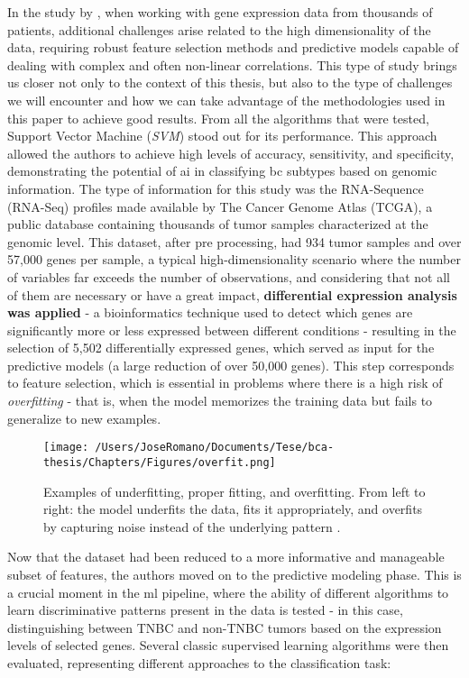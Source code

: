 In the study by \textcite{bca_subtypes_with_ml_Wu_2021}, when working with gene
expression data from thousands of patients, additional challenges arise related
to the high dimensionality of the data, requiring robust feature selection
methods and predictive models capable of dealing with complex and often
non-linear correlations. This type of study brings us closer not only to the
context of this thesis, but also to the type of challenges we will encounter
and how we can take advantage of the methodologies used in this paper to
achieve good results. From all the algorithms that were tested, Support Vector
Machine (\textit{SVM}) stood out for its performance. This approach allowed the
authors to achieve high levels of accuracy, sensitivity, and specificity,
demonstrating the potential of \gls{ai} in classifying \gls{bc} subtypes based
on genomic information. The type of information for this study was the
RNA-Sequence (RNA-Seq) profiles made available by The Cancer Genome Atlas
(TCGA), a public database containing thousands of tumor samples characterized
at the genomic level. This dataset, after pre processing, had 934 tumor samples
and over 57{,}000 genes per sample, a typical high-dimensionality scenario
where the number of variables far exceeds the number of observations, and
considering that not all of them are necessary or have a great impact,
\textbf{differential expression analysis was applied} - a bioinformatics
technique used to detect which genes are significantly more or less expressed
between different conditions - resulting in the selection of 5{,}502
differentially expressed genes, which served as input for the predictive models
(a large reduction of over 50{,}000 genes). This step corresponds to feature
selection, which is essential in problems where there is a high risk of
\textit{overfitting} - that is, when the model memorizes the training data but
fails to generalize to new examples.

\begin{figure} [h]
  \centering
  \texttt{[image: /Users/JoseRomano/Documents/Tese/bca-thesis/Chapters/Figures/overfit.png]}
  \caption{Examples of underfitting, proper fitting, and overfitting.
    From left to right: the model underfits the data, fits it appropriately, and overfits by capturing noise instead of the underlying pattern \cite{overfiting_ailab_mti_image}.}
  \label{fig:overfitting}
\end{figure}

Now that the dataset had been reduced to a more informative and manageable
subset of features, the authors moved on to the predictive modeling phase. This
is a crucial moment in the \gls{ml} pipeline, where the ability of different
algorithms to learn discriminative patterns present in the data is tested - in
this case, distinguishing between TNBC and non-TNBC tumors based on the
expression levels of selected genes. Several classic supervised learning
algorithms were then evaluated, representing different approaches to the
classification task:

